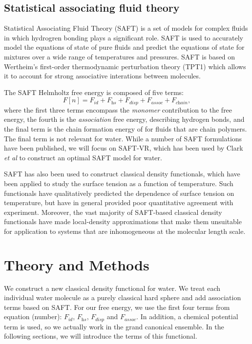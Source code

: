 \documentclass[letterpaper,twocolumn,amsmath,amssymb,prb]{revtex4-1}
\begin{document}
\subsection{Statistical associating fluid theory}

Statistical Associating Fluid Theory (SAFT) is a set of models for
complex fluids in which hydrogren bonding plays a significant
role\cite{muller2001molecular}.  SAFT is used to accurately model the
equations of state of pure fluids and predict the equations of state
for mixtures over a wide range of temperatures and pressures.  SAFT is
based on Wertheim's first-order thermodynamic perturbation theory
(TPT1) \cite{wertheim1984fluidsI, wertheim1984fluidsII,
  wertheim1986fluidsIII, wertheim1986fluidsIV} which allows it to
account for strong associative interations between molecules.

The SAFT Helmholtz free energy is composed of five terms:
\begin{equation}
  F[n] = F_\textit{id} + F_\textit{hs} + F_\textit{disp} +
  F_\textit{assoc} + F_\textit{chain},
\end{equation}
where the first three terms encompass the \emph{monomer} contribution
to the free energy, the fourth is the \emph{association} free energy,
describing hydrogen bonds, and the final term is the chain formation
energy of for fluids that are chain polymers.  The final term is not
relevant for water.  While a number of SAFT formulations have been
published, we will focus on SAFT-VR\cite{gil-villegas-1997-SAFT-VR},
which has been used by Clark \emph{et al} to construct an optimal SAFT
model for water\cite{clark2006developing}.

SAFT has also been used to construct classical density functionals,
which have been applied to study the surface tension as a function of
temperature\cite{whotocite}.  Such functionals have qualitatively
predicted the dependence of surface tension on temperature, but have
in general provided poor quantitative agreement with experiment.
Moreover, the vast majority of SAFT-based classical density
functionals have made local-density approximations that make them
unsuitable for application to systems that are inhomogeneous at the
molecular length scale\cite{felipe2001examination, gloor2002saft,
  gloor2004accurate, clark2006developing, gloor2007prediction,
  kahl2008modified, gross2009density}.

\section{Theory and Methods}
We construct a new classical density functional for water. We treat
each individual water molecule as a purely classical hard sphere and
add association terms based on SAFT. For our free energy, we use the
first four terms from equation (number): $F_\textit{id}$,
$F_\textit{hs}$, $F_\textit{disp}$ and $F_\textit{assoc}$. In
addition, a chemical potential term is used, so we actually work in
the grand canonical ensemble.  In the following sections, we will
introduce the terms of this functional.
\end{document}
